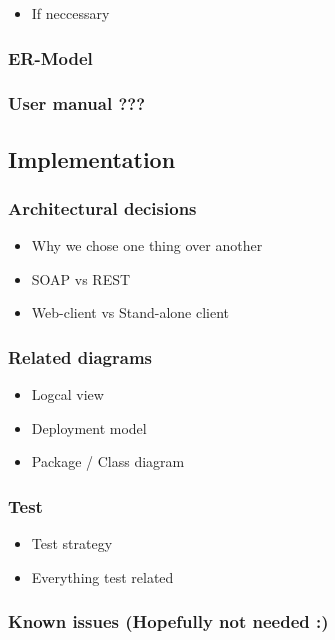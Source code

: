 \documentclass[11pt]{article}
\begin{document}
\begin{itemize}
\item If neccessary
\end{itemize}
\subsubsection{ER-Model}
\label{sec-1-3-4}
\subsubsection{User manual ???}
\label{sec-1-3-5}
\subsection{Implementation}
\label{sec-1-4}
\subsubsection{Architectural decisions}
\label{sec-1-4-1}

\begin{itemize}
\item Why we chose one thing over another
\item SOAP vs REST
\item Web-client vs Stand-alone client
\end{itemize}
\subsubsection{Related diagrams}
\label{sec-1-4-2}

\begin{itemize}
\item Logcal view
\item Deployment model
\item Package / Class diagram
\end{itemize}
\subsubsection{Test}
\label{sec-1-4-3}

\begin{itemize}
\item Test strategy
\item Everything test related
\end{itemize}
\subsubsection{Known issues (Hopefully not needed :)}
\label{sec-1-4-4}
\end{document}
